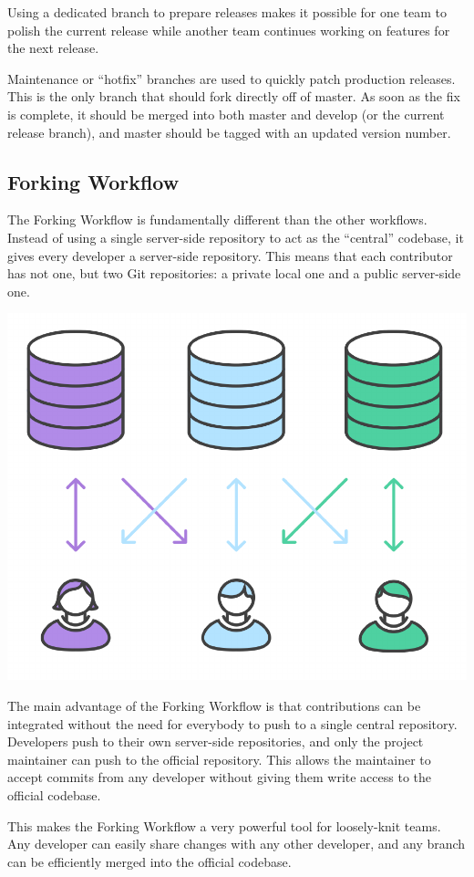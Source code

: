 \documentclass{article}
\begin{document}
Using a dedicated branch to prepare releases makes it possible for one
team to polish the current release while another team continues
working on features for the next release.

Maintenance or ``hotfix'' branches are used to quickly patch production
releases. This is the only branch that should fork directly off of
master. As soon as the fix is complete, it should be merged into both
master and develop (or the current release branch), and master should
be tagged with an updated version number.

\subsection{Forking Workflow}

The Forking Workflow is fundamentally different than the other
workflows. Instead of using a single
server-side repository to act as the ``central'' codebase, it gives
every developer a server-side repository. This means that each
contributor has not one, but two Git repositories: a private local one
and a public server-side one.

\begin{center}
\includegraphics[scale=0.5]{figures/15.pdf}
\end{center}

The main advantage of the Forking Workflow is that contributions can
be integrated without the need for everybody to push to a single
central repository. Developers push to their own server-side
repositories, and only the project maintainer can push to the official
repository. This allows the maintainer to accept commits from any
developer without giving them write access to the official codebase.

This makes the Forking Workflow a very powerful tool for loosely-knit
teams. Any developer can easily share changes with any other
developer, and any branch can be efficiently merged into the official
codebase.
\end{document}
